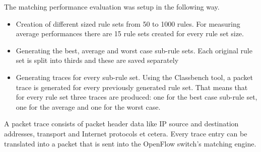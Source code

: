 \documentclass[a4paper,
		12pt,
		parskip=full,
		titlepage
		]{scrartcl}
\begin{document}
The matching performance evaluation was setup in the following way.
\begin{itemize}
    \item Creation of different sized rule sets from 50 to 1000 rules.
        For measuring average performances there are 15 rule sets created for every rule set size.
    \item Generating the best, average and worst case sub-rule sets. 
        Each original rule set is split into thirds and these are saved separately
    \item Generating traces for every sub-rule set.
        Using the Classbench\cite{classbench_website} tool, a packet trace is generated for every previously generated rule set.
        That means that for every rule set three traces are produced: one for the best case sub-rule set, one for the average and one for the worst case.
\end{itemize}
A packet trace consists of packet header data like IP source and destination addresses, transport and Internet protocols et cetera.
Every trace entry can be translated into a packet that is sent into the OpenFlow switch's matching engine.

\newpage
{}


\end{document}
